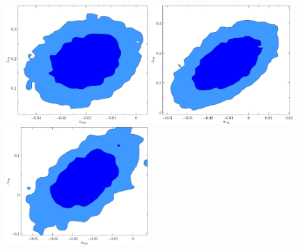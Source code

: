 \documentclass[11pt]{article}
\def \halffigwidth{0.48\textwidth}
\begin{document}
\begin{figure}
  \includegraphics[width = \halffigwidth]{ldip20to30_nrun_dipamp_2D.pdf}%
  \includegraphics[width = \halffigwidth]{ldip2to30_nrun_dipamp_2D.pdf}
  \includegraphics[width = \halffigwidth]{ldip2to40_nrun_dipamp_2D.pdf}%

\end{figure}
\end{document}
